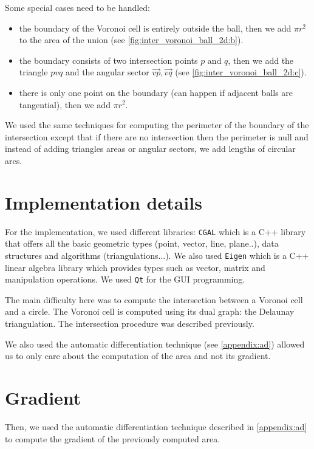 Some special cases need to be handled:
\begin{itemize}
    \item the boundary of the Voronoi cell is entirely outside the ball, then we
        add $ \pi r^2 $ to the area of the union (see
        \ref{fig:inter_voronoi_ball_2d:b}).
    \item the boundary consists of two intersection points $ p $ and $ q $, then
        we add the triangle $ pvq $ and the angular sector $ \vec{vp}, \vec{vq}
        $ (see \ref{fig:inter_voronoi_ball_2d:c}).
    \item there is only one point on the boundary (can happen if adjacent balls
        are tangential), then we add $ \pi r^2 $.
\end{itemize}

We used the same techniques for computing the perimeter of the boundary of the
intersection except that if there are no intersection then the perimeter is null
and instead of adding triangles areas or angular sectors, we add lengths of
circular arcs.

\section{Implementation details}

For the implementation, we used different libraries: \texttt{CGAL} which is a
C++ library that offers all the basic geometric types (point, vector, line,
plane..), data structures and algorithms (triangulations...). We also used
\texttt{Eigen} which is a C++ linear algebra library which provides types such
as vector, matrix and manipulation operations. We used \texttt{Qt} for the GUI
programming.

The main difficulty here was to compute the intersection between a Voronoi cell
and a circle. The Voronoi cell is computed using its dual graph: the Delaunay
triangulation. The intersection procedure was described previously.

We also used the automatic differentiation technique (see \ref{appendix:ad})
allowed us to only care about the computation of the area and not its gradient.

\section{Gradient}

Then, we used the automatic differentiation technique described in
\ref{appendix:ad} to compute the gradient of the previously computed area.

